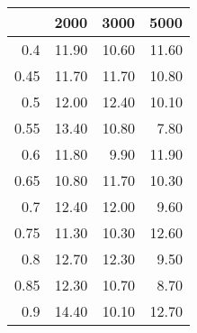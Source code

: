 \begin{table}[ht]
\centering
\begin{tabular}{rrrr}
  \hline
 & 2000 & 3000 & 5000 \\ 
  \hline
0.4 & 11.90 & 10.60 & 11.60 \\ 
  0.45 & 11.70 & 11.70 & 10.80 \\ 
  0.5 & 12.00 & 12.40 & 10.10 \\ 
  0.55 & 13.40 & 10.80 & 7.80 \\ 
  0.6 & 11.80 & 9.90 & 11.90 \\ 
  0.65 & 10.80 & 11.70 & 10.30 \\ 
  0.7 & 12.40 & 12.00 & 9.60 \\ 
  0.75 & 11.30 & 10.30 & 12.60 \\ 
  0.8 & 12.70 & 12.30 & 9.50 \\ 
  0.85 & 12.30 & 10.70 & 8.70 \\ 
  0.9 & 14.40 & 10.10 & 12.70 \\ 
   \hline
\end{tabular}
\end{table}
